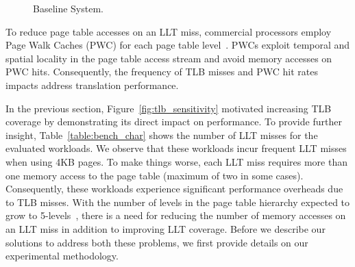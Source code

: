 

\begin{figure}[t]
\vspace{0. in}
\centering
\centerline{}

        \caption{\small Baseline System. \normalsize}

\label{fig:config}
\vspace{-.2 in}
\end{figure}


To reduce page table accesses on an LLT miss, commercial processors
employ Page Walk Caches (PWC) for each page table level~\cite{SkipPT,
MMUcaches}. PWCs exploit temporal and spatial locality in the page
table access stream and avoid memory accesses on PWC hits.
Consequently, the frequency of TLB misses and PWC hit rates impacts
address translation performance.



In the previous section, Figure~\ref{fig:tlb_sensitivity} motivated
increasing TLB coverage by demonstrating its direct impact on
performance. To provide further insight, Table~\ref{table:bench_char}
shows the number of LLT misses for the evaluated workloads. We observe
that these workloads incur frequent LLT misses when using 4KB pages.
To make things worse, each LLT miss requires more than one memory
access to the page table (maximum of two in some cases). Consequently,
these workloads experience significant performance overheads due to
TLB misses. With the number of levels in the page table hierarchy
expected to grow to 5-levels~\cite{x86_5level}, there is a need for
reducing the number of memory accesses on an LLT miss in addition to
improving LLT coverage. Before we describe our solutions to address
both these problems, we first provide details on our experimental
methodology.


